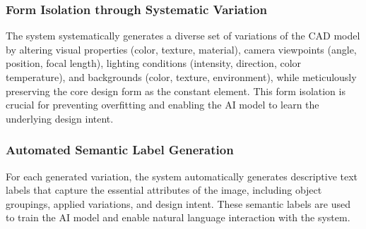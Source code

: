 \documentclass{article}
\begin{document}
\subsubsection{Form Isolation through Systematic Variation}
The system systematically generates a diverse set of variations of the CAD model by altering visual properties (color, texture, material), camera viewpoints (angle, position, focal length), lighting conditions (intensity, direction, color temperature), and backgrounds (color, texture, environment), while meticulously preserving the core design form as the constant element. This form isolation is crucial for preventing overfitting and enabling the AI model to learn the underlying design intent.

\subsubsection{Automated Semantic Label Generation}
For each generated variation, the system automatically generates descriptive text labels that capture the essential attributes of the image, including object groupings, applied variations, and design intent. These semantic labels are used to train the AI model and enable natural language interaction with the system.
\end{document}
